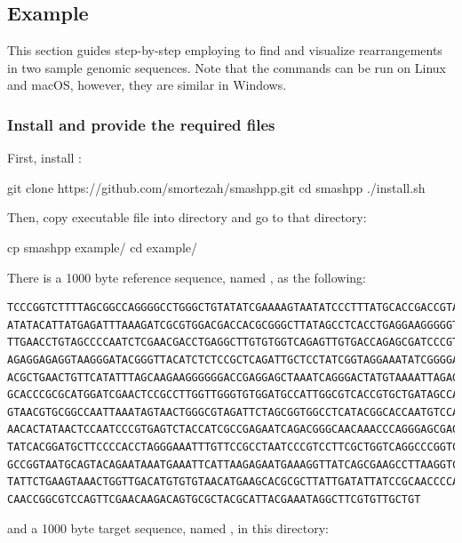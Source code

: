 \documentclass[a4paper,9pt]{extarticle}
\begin{document}
\subsection{Example}
This section guides step-by-step employing \smashpp to find and visualize rearrangements in two sample genomic sequences. Note that the commands can be run on Linux and macOS, however, they are similar in Windows.

\subsubsection*{Install \smashpp and provide the required files}
First, install \smashpp:
\begin{code}[style=bash]
git clone https://github.com/smortezah/smashpp.git
cd smashpp
./install.sh
\end{code}
Then, copy  executable file into  directory and go to that directory:
\begin{code}[style=bash]
cp smashpp example/
cd example/
\end{code}
There is a 1000 byte reference sequence, named , as the following:
\begin{verbatim}
TCCCGGTCTTTTAGCGGCCAGGGGCCTGGGCTGTATATCGAAAAGTAATATCCCTTTATGCACCGACCGTAATTATGGACAGCAC
ATATACATTATGAGATTTAAAGATCGCGTGGACGACCACGCGGGCTTATAGCCTCACCTGAGGAAGGGGGTGCCTGCGAGGGAGC
TTGAACCTGTAGCCCCAATCTCGAACGACCTGAGGCTTGTGTGGTCAGAGTTGTGACCAGAGCGATCCCGTTGTCAAATCAACCT
AGAGGAGAGGTAAGGGATACGGGTTACATCTCTCCGCTCAGATTGCTCCTATCGGTAGGAAATATCGGGGATAACCCAATACAAA
ACGCTGAACTGTTCATATTTAGCAAGAAGGGGGGACCGAGGAGCTAAATCAGGGACTATGTAAAATTAGAGTTCTAAGGATAGTA
GCACCCGCGCATGGATCGAACTCCGCCTTGGTTGGGTGTGGATGCCATTGGCGTCACCGTGCTGATAGCCAAATCCCTAGTGAAG
GTAACGTGCGGCCAATTAAATAGTAACTGGGCGTAGATTCTAGCGGTGGCCTCATACGGCACCAATGTCCATCCTCCCTGTGCCT
AACACTATAACTCCAATCCCGTGAGTCTACCATCGCCGAGAATCAGACGGGCAACAAACCCAGGGAGCGAGAGCTACGCGGCTTA
TATCACGGATGCTTCCCCACCTAGGGAAATTTGTTCCGCCTAATCCCGTCCTTCGCTGGTCAGGCCCGGTCTAGCGGATTACTTC
GCCGGTAATGCAGTACAGAATAAATGAAATTCATTAAGAGAATGAAAGGTTATCAGCGAAGCCTTAAGGTCCAACAAGACGTCGA
TATTCTGAAGTAAACTGGTTGACATGTGTGTAACATGAAGCACGCGCTTATTGATATTATCCGCAACCCCACGGCTGGCGGGAAT
CAACCGGCGTCCAGTTCGAACAAGACAGTGCGCTACGCATTACGAAATAGGCTTCGTGTTGCTGT
\end{verbatim}
and a 1000 byte target sequence, named , in this directory:
\end{document}
